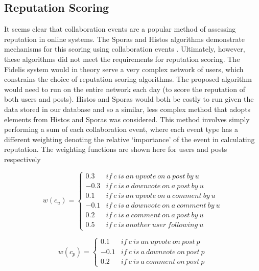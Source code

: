 \subsection{Reputation Scoring}
It seems clear that collaboration events are a popular method of assessing reputation in online systems. The Sporas and Histos algorithms demonstrate mechanisms for this scoring using collaboration events \cite{mcnally2013} \cite{zacharia2000}. Ultimately, however, these algorithms did not meet the requirements for reputation scoring. The Fidelis system would in theory serve a very complex network of users, which constrains the choice of reputation scoring algorithms. The proposed algorithm would need to run on the entire network each day (to score the reputation of both users and posts). Histos and Sporas would both be costly to run given the data stored in our database and so a similar, less complex method that adopts elements from Histos and Sporas was considered. This method involves simply performing a sum of each collaboration event, where each event type has a different weighting denoting the relative `importance' of the event in calculating reputation. The weighting functions are shown here for users and posts respectively

\begin{equation}
	\label{eq:rep_weight_user}
		w(c_u) = \left\{\begin{matrix}
			0.3 & if\ c\ is\ an\ upvote\ on\ a\ post\ by\ u\\ 
			-0.3 & if\ c\ is\ a\ downvote\ on\ a\ post\ by\ u \\ 
			0.1 & if\ c\ is\ an\ upvote\ on\ a\ comment\ by\ u \\ 
			-0.1 & if\ c\ is\ a\ downvote\ on\ a\ comment\ by\ u \\ 
			0.2 & if\ c\ is\ a\ comment\ on\ a\ post\ by\ u\\ 
			0.5 & if\ c\ is\ another\ user\ following\ u
		\end{matrix}\right.
\end{equation}
		
\begin{equation}
	\label{eq:rep_weight_post}
	 w(c_p) = \left\{\begin{matrix}
			0.1 & if\ c\ is\ an\ upvote\ on\ post\ p \\ 
			-0.1 & if\ c\ is\ a\ downvote\ on\ post\ p \\ 
			0.2 & if\ c\ is\ a\ comment\ on\ post\ p
	\end{matrix}\right.
\end{equation}

